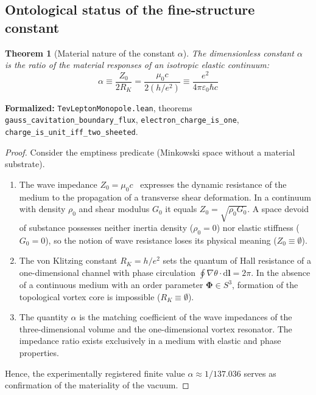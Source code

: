 \documentclass[11pt,a4paper]{article}
\newtheorem{theorem}{Theorem}
\theoremstyle{definition}
\theoremstyle{remark}
\begin{document}
\subsection{Ontological status of the fine-structure constant}
	
\begin{theorem}[Material nature of the constant $\alpha$]
\label{thm:alpha_materiality_proof}
The dimensionless constant $\alpha$ is the ratio of the material responses of an isotropic elastic continuum:
\begin{equation}
\alpha \equiv \frac{Z_0}{2 R_K} = \frac{\mu_0 c}{2 (h/e^2)} \equiv \frac{e^2}{4\pi\varepsilon_0 \hbar c}
\end{equation}
\end{theorem}

\noindent\small\textbf{Formalized:} \texttt{TevLeptonMonopole.lean}, theorems \texttt{gauss_cavitation_boundary_flux}, \texttt{electron_charge_is_one}, \texttt{charge_is_unit_iff_two_sheeted}.

\begin{proof}
Consider the emptiness predicate (Minkowski space without a material substrate).
\begin{enumerate}
\item The wave impedance $Z_0 = \mu_0 c$~\cite{Gordon1923} expresses the dynamic resistance of the medium to the propagation of a transverse shear deformation. In a continuum with density $\rho_0$ and shear modulus $G_0$ it equals $Z_0 = \sqrt{\rho_0 G_0}$. A space devoid of substance possesses neither inertia density ($\rho_0 = 0$) nor elastic stiffness ($G_0 = 0$), so the notion of wave resistance loses its physical meaning ($Z_0 \equiv \emptyset$).
\item The von Klitzing constant $R_K = h/e^2$ sets the quantum of Hall resistance of a one-dimensional channel with phase circulation $\oint \nabla\theta \cdot \mathrm{d}\mathbf{l} = 2\pi$. In the absence of a continuous medium with an order parameter $\boldsymbol{\Phi} \in S^3$, formation of the topological vortex core is impossible ($R_K \equiv \emptyset$).
\item The quantity $\alpha$ is the matching coefficient of the wave impedances of the three-dimensional volume and the one-dimensional vortex resonator. The impedance ratio exists exclusively in a medium with elastic and phase properties.
\end{enumerate}
Hence, the experimentally registered finite value $\alpha \approx 1/137.036$ serves as confirmation of the materiality of the vacuum.
\end{proof}
\end{document}
